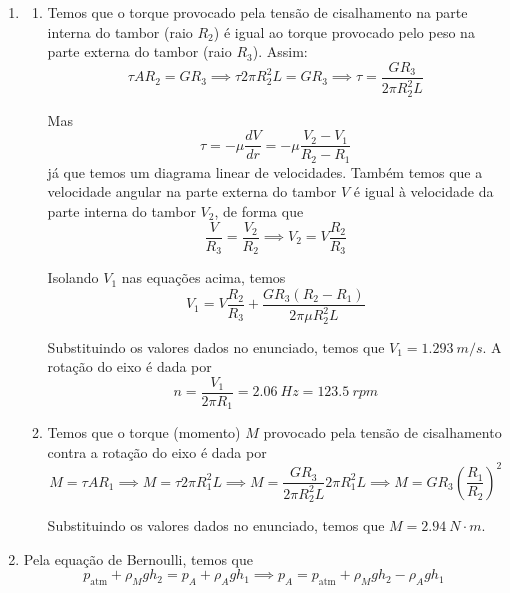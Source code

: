 \documentclass[12pt,a4paper,brazilian, fleqn]{article}
\begin{document}
\begin{enumerate}
    \item%
        \begin{enumerate}
            \item Temos que o torque provocado pela tensão de cisalhamento
                na parte interna do tambor (raio \(R_2\)) é igual ao
                torque provocado pelo peso na parte externa do tambor (raio \(R_3\)).
                Assim:
                \[
                    \tau A R_2 = G R_3 \implies
                    \tau 2\pi R_2^2 L = G R_3 \implies \tau = \frac{GR_3}{2\pi R_2^2 L}
                \]

                Mas 
                \[
                    \tau = -\mu \frac{dV}{dr} = -\mu \frac{V_2 - V_1}{R_2 - R_1}
                \]
                já que temos um diagrama linear de velocidades. Também temos que
                a velocidade angular na parte externa do tambor \(V\) é igual à velocidade
                da parte interna do tambor \(V_2\), de forma que
                \[
                    \frac{V}{R_3} = \frac{V_2}{R_2} \implies
                    V_2 = V\frac{R_2}{R_3}
                \]

                Isolando \(V_1\) nas equações acima, temos
                \[
                    V_1 = V\frac{R_2}{R_3} +
                    \frac{GR_3(R_2-R_1)}{2\pi \mu R_2^2 L}
                \]

                Substituindo os valores dados no enunciado, temos que
                \(V_1 = \SI{1.293}{m/s}\). A rotação do eixo é dada por 
                \[
                    n = \frac{V_1}{2\pi R_1} = \SI{2.06}{Hz} = \SI{123.5}{rpm}
                \]

            \item Temos que o torque (momento) \(M\) provocado pela tensão de cisalhamento 
                contra a rotação do eixo é dada por
                \[
                    M=\tau A R_1 \implies M = \tau 2\pi R_1^2 L \implies
                    M = \frac{GR_3}{2\pi R_2^2 L} 2\pi R_1^2 L \implies
                    M = GR_3 \left(\frac{R_1}{R_2}\right)^2
                \]

                Substituindo os valores dados no enunciado, temos que
                \(M=\SI{2.94}{N\cdot m}\).
        \end{enumerate}

    \item Pela equação de Bernoulli, temos que
        \[
            p_\text{atm}+\rho_M g h_2 = p_A + \rho_A g h_1 \implies
            p_A = p_\text{atm}+\rho_M g h_2 - \rho_A g h_1
        \]


\end{enumerate}
\end{document}
